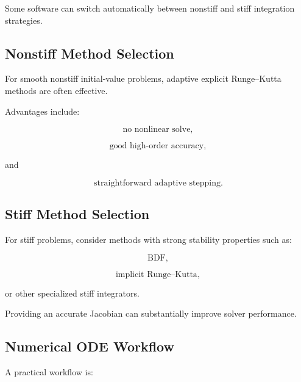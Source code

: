 Some software can switch automatically between nonstiff and stiff
integration strategies.

\subsection{Nonstiff Method Selection}
\label{subsec:nonstiff-method-selection}

For smooth nonstiff initial-value problems, adaptive explicit Runge--Kutta
methods are often effective.

Advantages include:

\[
\boxed{
\text{no nonlinear solve},
}
\]

\[
\boxed{
\text{good high-order accuracy},
}
\]

and

\[
\boxed{
\text{straightforward adaptive stepping}.
}
\]

\subsection{Stiff Method Selection}
\label{subsec:stiff-method-selection}

For stiff problems, consider methods with strong stability properties such
as:

\[
\boxed{
\text{BDF},
}
\]

\[
\boxed{
\text{implicit Runge--Kutta},
}
\]

or other specialized stiff integrators.

Providing an accurate Jacobian can substantially improve solver
performance.

\subsection{Numerical ODE Workflow}
\label{subsec:numerical-ode-workflow}

A practical workflow is:

